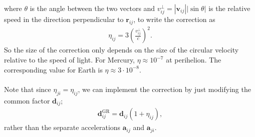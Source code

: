 \documentclass{article}
\newcommand{\lrp}[1]{\left(#1\right)}
\newcommand{\mb}[1]{\mathbf{#1}}
\begin{document}
where $\theta$ is the angle between the two vectors and $v_{ij}^\perp = |\mb{v}_{ij}||\sin{\theta}|$ is the relative speed in the direction perpendicular to $\mb{r}_{ij}$, to write the correction as
\begin{align*}
    \eta_{ij} = 3\lrp{\frac{v_{ij}^\perp}{c}}^2.
\end{align*}
So the size of the correction only depends on the size of the circular velocity relative to the speed of light. For Mercury, $\eta \approx 10^{-7}$ at perihelion. The corresponding value for Earth is $\eta \approx 3 \cdot 10^{-8}$. \\\\
Note that since $\eta_{ji} = \eta_{ij}$, we can implement the correction by just modifying the common factor $\mb{d}_{ij}$;
\begin{align*}
    \mb{d}_{ij}^\text{GR} = \mb{d}_{ij}\lrp{1 + \eta_{ij}},
\end{align*}
rather than the separate accelerations $\mb{a}_{ij}$ and $\mb{a}_{ji}$.
\end{document}
